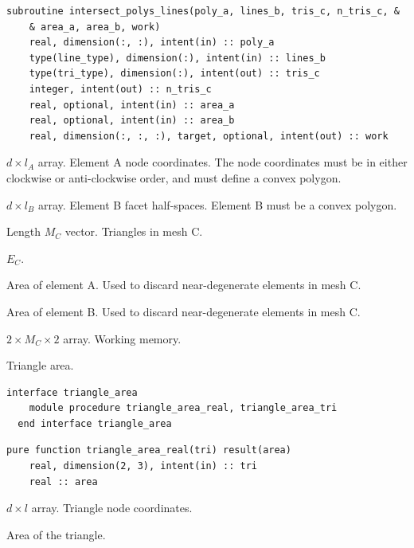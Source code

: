 \documentclass{article}
\begin{document}
\begin{lstlisting}[language=FORTRAN]
  subroutine intersect_polys_lines(poly_a, lines_b, tris_c, n_tris_c, &
    & area_a, area_b, work)
    real, dimension(:, :), intent(in) :: poly_a
    type(line_type), dimension(:), intent(in) :: lines_b
    type(tri_type), dimension(:), intent(out) :: tris_c
    integer, intent(out) :: n_tris_c
    real, optional, intent(in) :: area_a
    real, optional, intent(in) :: area_b
    real, dimension(:, :, :), target, optional, intent(out) :: work
\end{lstlisting}

\begin{description}[font=\ttfamily\bfseries,leftmargin=2.2\parindent,labelindent=1.7\parindent,noitemsep]
  \item[poly\_a] $d \times l_A$ array. Element A node coordinates. The node
    coordinates must be in either clockwise or anti-clockwise order, and must
    define a convex polygon.
  \item[lines\_b] $d \times l_B$ array. Element B facet half-spaces. Element B
    must be a convex polygon.
  \item[tris\_c] Length $M_C$ vector. Triangles in mesh C.
  \item[n\_tris\_c] $E_C$.
  \item[area\_a] Area of element A. Used to discard near-degenerate elements in
    mesh C.
  \item[area\_b] Area of element B. Used to discard near-degenerate elements in
    mesh C.
  \item[work] $2 \times M_C \times 2$ array. Working memory.
\end{description}

\noindent Triangle area.

\begin{lstlisting}[language=FORTRAN]
  interface triangle_area
    module procedure triangle_area_real, triangle_area_tri
  end interface triangle_area
\end{lstlisting}

\begin{lstlisting}[language=FORTRAN]
  pure function triangle_area_real(tri) result(area)
    real, dimension(2, 3), intent(in) :: tri
    real :: area
\end{lstlisting}

\begin{description}[font=\ttfamily\bfseries,leftmargin=2.2\parindent,labelindent=1.7\parindent,noitemsep]
  \item[tri] $d \times l$ array. Triangle node coordinates.
  \item[area] Area of the triangle.
\end{description}
\end{document}
